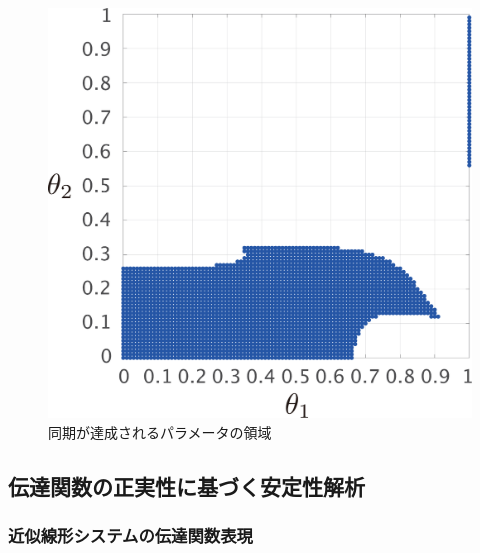 \documentclass[tombow,dvipdfmx]{corona-a5}
\begin{document}
\begin{figure}[t]
{\begin{minipage}{0.32\linewidth}
    \centering
    \includegraphics[width = .85\linewidth]{figs/gam5}
  \end{minipage}
  \caption{同期が達成されるパラメータの領域}
  \label{fig:gamsta}
  }
\end{figure}



\subsection{伝達関数の正実性に基づく安定性解析}

\subsubsection{近似線形システムの伝達関数表現}
\end{document}
